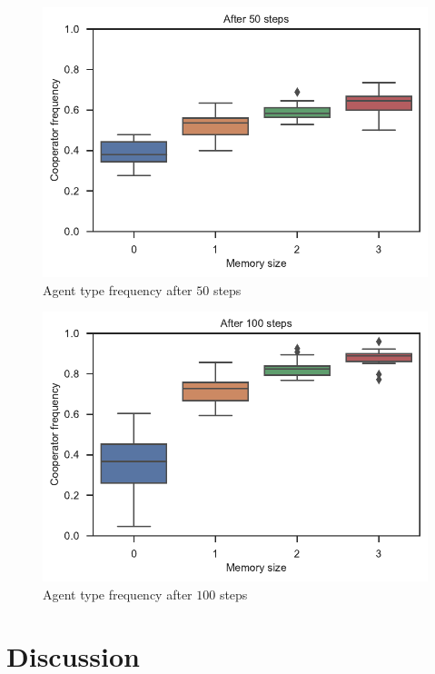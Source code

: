 \documentclass[english]{article}
\begin{document}
\begin{figure}[h!]
  \centering
  \includegraphics{cooperator_frequency_memory_50steps.pdf}
  \caption{Agent type frequency after $50$ steps}
  \label{table:cooperator_frequency_converged_50}
\end{figure}
\begin{figure}[h!]
  \centering
  \includegraphics{cooperator_frequency_memory_100steps.pdf}
  \caption{Agent type frequency after $100$ steps}
  \label{table:cooperator_frequency_converged_100}
\end{figure}



\section{Discussion}
\end{document}
